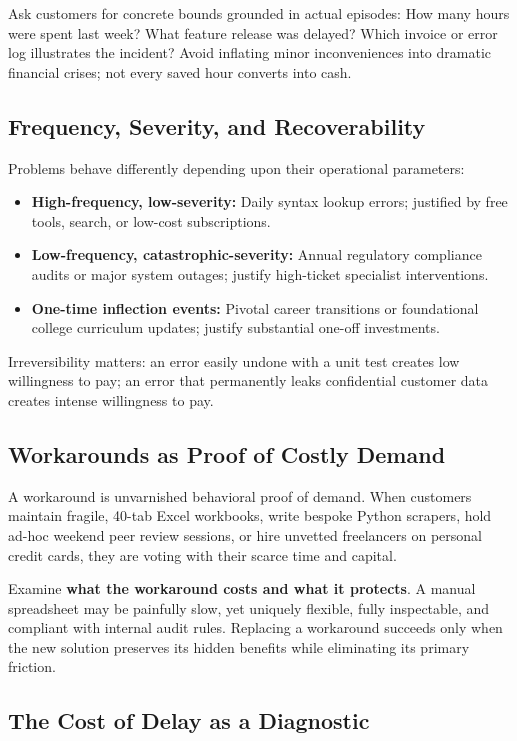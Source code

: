 Ask customers for concrete bounds grounded in actual episodes: How many hours were spent last week? What feature release was delayed? Which invoice or error log illustrates the incident? Avoid inflating minor inconveniences into dramatic financial crises; not every saved hour converts into cash.

\subsection{Frequency, Severity, and Recoverability}

Problems behave differently depending upon their operational parameters:
\begin{itemize}[leftmargin=1.2em,itemsep=0.2ex]
  \item \textbf{High-frequency, low-severity:} Daily syntax lookup errors; justified by free tools, search, or low-cost subscriptions.
  \item \textbf{Low-frequency, catastrophic-severity:} Annual regulatory compliance audits or major system outages; justify high-ticket specialist interventions.
  \item \textbf{One-time inflection events:} Pivotal career transitions or foundational college curriculum updates; justify substantial one-off investments.
\end{itemize}
Irreversibility matters: an error easily undone with a unit test creates low willingness to pay; an error that permanently leaks confidential customer data creates intense willingness to pay.

\subsection{Workarounds as Proof of Costly Demand}

A workaround is unvarnished behavioral proof of demand. When customers maintain fragile, 40-tab Excel workbooks, write bespoke Python scrapers, hold ad-hoc weekend peer review sessions, or hire unvetted freelancers on personal credit cards, they are voting with their scarce time and capital.

Examine \textbf{what the workaround costs and what it protects}. A manual spreadsheet may be painfully slow, yet uniquely flexible, fully inspectable, and compliant with internal audit rules. Replacing a workaround succeeds only when the new solution preserves its hidden benefits while eliminating its primary friction.

\subsection{The Cost of Delay as a Diagnostic}

